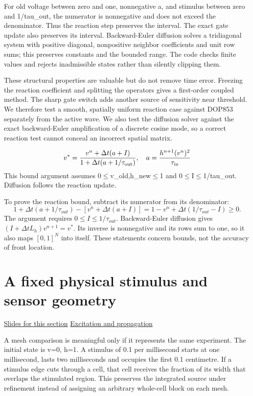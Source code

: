 \documentclass[11pt,letterpaper]{article}
\theoremstyle{definition}\newtheorem{definition}{Definition}\newtheorem{example}{Example}
\numberwithin{equation}{section}
\begin{document}
For old voltage between zero and one, nonnegative a, and stimulus between zero and 1/tau\_out, the numerator is nonnegative and does not exceed the denominator. Thus the reaction step preserves the interval. The exact gate update also preserves its interval. Backward-Euler diffusion solves a tridiagonal system with positive diagonal, nonpositive neighbor coefficients and unit row sums; this preserves constants and the bounded range. The code checks finite values and rejects inadmissible states rather than silently clipping them.

These structural properties are valuable but do not remove time error. Freezing the reaction coefficient and splitting the operators gives a first-order coupled method. The sharp gate switch adds another source of sensitivity near threshold. We therefore test a smooth, spatially uniform reaction case against DOP853 separately from the active wave. We also test the diffusion solver against the exact backward-Euler amplification of a discrete cosine mode, so a correct reaction test cannot conceal an incorrect spatial matrix.

\[
v^*=\frac{v^n+\Delta t(a+I)}{1+\Delta t(a+1/\tau_{\rm out})},\quad a=\frac{h^{n+1}(v^n)^2}{\tau_{\rm in}}
\]
This bound argument assumes 0\ensuremath{\le}v\_old,h\_new\ensuremath{\le}1 and 0\ensuremath{\le}I\ensuremath{\le}1/tau\_out. Diffusion follows the reaction update.

To prove the reaction bound, subtract its numerator from its denominator:
\[
 1+\Delta t(a+1/\tau_{out})-
 [v^n+\Delta t(a+I)]
 =1-v^n+\Delta t(1/\tau_{out}-I)\ge0.
\]
The argument requires $0\le I\le1/\tau_{out}$. Backward-Euler diffusion gives $(I+\Delta tL_h)v^{n+1}=v^*$. Its inverse is nonnegative and its rows sum to one, so it also maps $[0,1]^N$ into itself. These statements concern bounds, not the accuracy of front location.
\section{A fixed physical stimulus and sensor geometry}
\hypertarget{note-a-fixed-physical-stimulus-and-sensor-geometry}{}\label{note:a-fixed-physical-stimulus-and-sensor-geometry}
{\small \href{slides.html\#frame=a-fixed-spatial-source-panel-1\&step=1}{Slides for this section} \quad \href{../modules/animations/excitable-wave.html}{Excitation and propagation}}\par
A mesh comparison is meaningful only if it represents the same experiment. The initial state is v=0, h=1. A stimulus of 0.1 per millisecond starts at one millisecond, lasts two milliseconds and occupies the first 0.1 centimetre. If a stimulus edge cuts through a cell, that cell receives the fraction of its width that overlaps the stimulated region. This preserves the integrated source under refinement instead of assigning an arbitrary whole-cell block on each mesh.
\end{document}
